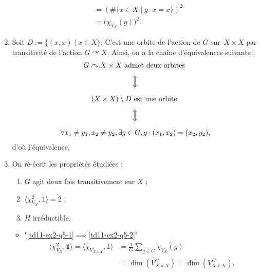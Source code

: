 \documentclass[./main]{subfiles}
\begin{document}
\begin{enumerate}
\begin{align*}
        &= (\# \{x \in X  \mid g \cdot x = x\})^2 \\
        &= \big(\chi_{V_X}(g)\big)^2
      .\end{align*}
    \item Soit $D := \{(x,x)  \mid x \in X\}$. C'est une orbite de l'action de $G$ sur~$X \times X$ par transitivité de l'action $G \curvearrowright X$.
      Ainsi, on a la chaîne d'équivalences suivante :
      \begin{gather*}
        G \curvearrowright X \times X \text{ admet deux orbites }\\
        \rotatebox{90}{$\iff$}\\
        (X \times X) \setminus D \text{ est une orbite }\\
        \rotatebox{90}{$\iff$}\\
        \forall x_1 \neq y_1, x_2 \neq y_2, \exists g \in G, g\cdot (x_1, x_2) = (x_2, y_2)
      ,\end{gather*}
      d'où l'équivalence.
    \item On ré-écrit les propriétés étudiées :
      \begin{enumerate}[label=(\textit{\roman*})]
        \item \label{td11-ex2-q5-1} $G$ agit deux fois transitivement sur $X$ ;
        \item \label{td11-ex2-q5-2} $\langle \chi_{V_X}^2, \mathds{1} \rangle = 2$ ;
        \item \label{td11-ex2-q5-3} $H$ irréductible.
      \end{enumerate}

      \begin{itemize}
        \item "\ref{td11-ex2-q5-1}$\implies$\ref{td11-ex2-q5-2}"
          \begin{align*}
            \langle \chi_{V_X}^2, \mathds{1} \rangle = \langle \chi_{V_{X \times X}}, \mathds{1} \rangle &= \frac{1}{G} \sum_{g \in G} \overline{\chi_{V_X}(g)}\\
            &= \overline{\dim(V^G_{X \times X})} = \dim(V_{X \times X}^G)
          .\end{align*}
      \end{itemize}
  \end{enumerate}
\end{document}
